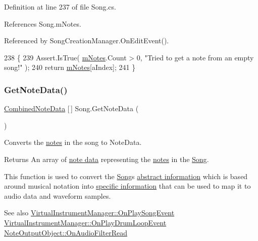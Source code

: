 Definition at line 237 of file Song.\+cs.



References Song.\+m\+Notes.



Referenced by Song\+Creation\+Manager.\+On\+Edit\+Event().


\begin{DoxyCode}
238     \{
239         Assert.IsTrue( \hyperlink{group___song_priv_var_ga674bc904a1f856d485d5fb7fe84bac85}{mNotes}.Count > 0, \textcolor{stringliteral}{"Tried to get a note from an empty song!"} );
240         \textcolor{keywordflow}{return} \hyperlink{group___song_priv_var_ga674bc904a1f856d485d5fb7fe84bac85}{mNotes}[aIndex];
241     \}
\end{DoxyCode}
\mbox{\label{group___song_pub_func_gae3df1fd5448b7d9cefb0fed4af967985}} 
\subsubsection{\texorpdfstring{Get\+Note\+Data()}{GetNoteData()}}
{\footnotesize\ttfamily \hyperlink{group___song_structs_struct_song_1_1_combined_note_data}{Combined\+Note\+Data} \mbox{[}$\,$\mbox{]} Song.\+Get\+Note\+Data (\begin{DoxyParamCaption}{ }\end{DoxyParamCaption})}



Converts the \hyperlink{group___music_structs_struct_music_1_1_combined_note}{notes} in the song to Note\+Data. 

\begin{DoxyReturn}{Returns}
An array of \hyperlink{group___song_structs_struct_song_1_1_combined_note_data}{note data} representing the \hyperlink{group___music_structs_struct_music_1_1_combined_note}{notes} in the \hyperlink{class_song}{Song}.
\end{DoxyReturn}
This function is used to convert the \hyperlink{class_song}{Song}\textquotesingle{}s \hyperlink{group___music_structs_struct_music_1_1_combined_note}{abstract information} which is based around musical notation into \hyperlink{group___song_structs_struct_song_1_1_combined_note_data}{specific information} that can be used to map it to audio data and waveform samples.

\begin{DoxySeeAlso}{See also}
\hyperlink{group___v_i_m_handlers_ga7fd877a7d429403abbfd2728aa63c056}{Virtual\+Instrument\+Manager\+::\+On\+Play\+Song\+Event} \hyperlink{group___v_i_m_handlers_gae2e2010b9a36ae2409466181ae0b9679}{Virtual\+Instrument\+Manager\+::\+On\+Play\+Drum\+Loop\+Event} \hyperlink{group___n_o_o_handlers_gaafd22f8a8c8d2cf101a54a4bf92782a5}{Note\+Output\+Object\+::\+On\+Audio\+Filter\+Read} 
\end{DoxySeeAlso}


